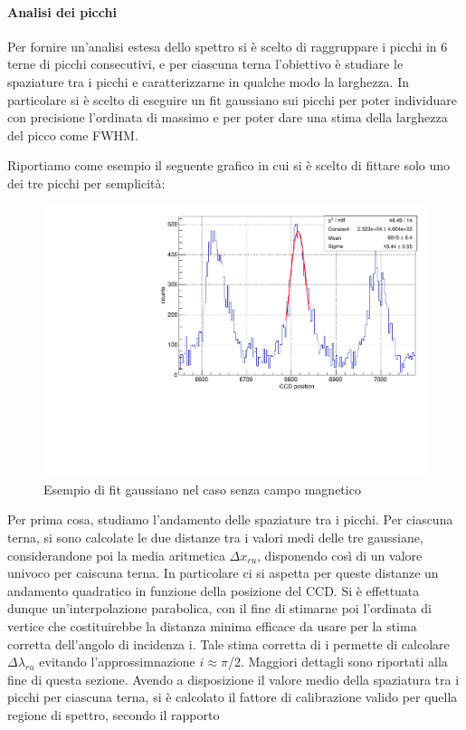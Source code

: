\documentclass{article}
\begin{document}
	\paragraph{Analisi dei picchi}


	Per fornire un'analisi estesa dello spettro si è scelto di raggruppare
	i picchi in 6 terne di picchi consecutivi, e per ciascuna terna
	l'obiettivo è studiare le spaziature tra i picchi e caratterizzarne in
	qualche modo la larghezza. 
	In particolare si è scelto di eseguire un fit gaussiano sui picchi
	per poter individuare con precisione l'ordinata di massimo e per
	poter dare una stima della larghezza del picco come FWHM.
	
	Riportiamo come esempio il seguente grafico in cui si è scelto di fittare solo uno dei  tre picchi per semplicità:
	
	\begin{center}
		\begin{figure}[H]
			\centering
			\includegraphics[scale=0.38, angle=0]{campospento/singolo.pdf}
			\caption{ Esempio di fit gaussiano nel caso senza campo magnetico}
			\label{fig:singoloBoff}
		\end{figure}
	\end{center}
	

	Per prima cosa, studiamo l'andamento delle spaziature tra i picchi. 
	Per ciascuna terna, si sono calcolate le due distanze tra i valori medi
	delle tre gaussiane, considerandone poi la media aritmetica $\Delta x_{ru}$,
	disponendo così di un valore univoco per caiscuna terna.
	In particolare ci si aspetta per queste distanze un andamento quadratico 
	in funzione della posizione del CCD. Si è effettuata dunque un'interpolazione
	parabolica, con il fine di stimarne poi l'ordinata di vertice che 
	costituirebbe la distanza minima efficace da usare per la stima
	corretta dell'angolo di incidenza i. Tale stima corretta di i
	permette di calcolare $\Delta\lambda_{ru}$ evitando l'approssimnazione $i \approx \pi$/2. 
	Maggiori dettagli sono riportati alla fine di questa sezione.
	Avendo a disposizione il valore medio della spaziatura tra i picchi per ciascuna
	terna, si è calcolato il fattore di calibrazione valido per quella regione
	di spettro, secondo il rapporto
\end{document}
